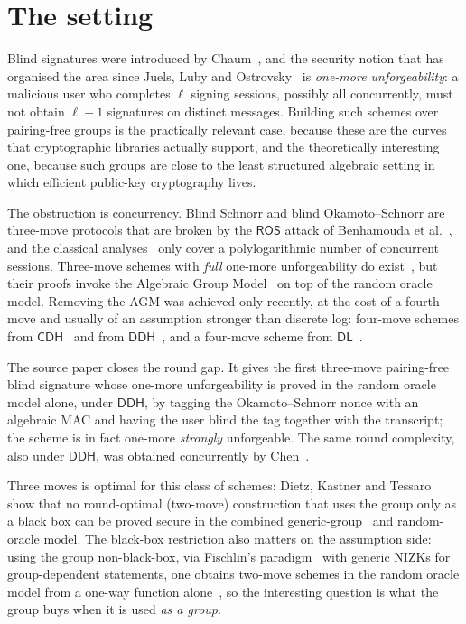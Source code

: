 \documentclass{conjura-conjecture}
\newcommand{\DL}{\mathsf{DL}}
\newcommand{\DDH}{\mathsf{DDH}}
\newcommand{\CDH}{\mathsf{CDH}}
\newcommand{\ROSassm}{\mathsf{ROS}}
\begin{document}
\section{The setting}\label{sec:setting}

Blind signatures were introduced by Chaum~\cite{Cha82}, and the security
notion that has organised the area since Juels, Luby and
Ostrovsky~\cite{JLO97} is \emph{one-more unforgeability}: a malicious user
who completes $\ell$ signing sessions, possibly all concurrently, must not
obtain $\ell + 1$ signatures on distinct messages. Building such schemes
over pairing-free groups is the practically relevant case, because these
are the curves that cryptographic libraries actually support, and the
theoretically interesting one, because such groups are close to the least
structured algebraic setting in which efficient public-key cryptography
lives.

The obstruction is concurrency. Blind Schnorr and blind Okamoto--Schnorr
are three-move protocols that are broken by the $\ROSassm$ attack of
Benhamouda et al.~\cite{BLL21}, and the classical analyses~\cite{PS00}
only cover a polylogarithmic number of concurrent sessions. Three-move
schemes with \emph{full} one-more unforgeability do exist~\cite{Abe01,TZ22},
but their proofs invoke the Algebraic Group Model~\cite{FKL18} on top of
the random oracle model. Removing the AGM was achieved only recently, at
the cost of a fourth move and usually of an assumption stronger than
discrete log: four-move schemes from $\CDH$~\cite{CATZ24} and from
$\DDH$~\cite{KR25}, and a four-move scheme from $\DL$~\cite{KLR25}.

The source paper closes the round gap. It gives the first three-move
pairing-free blind signature whose one-more unforgeability is proved in
the random oracle model alone, under $\DDH$, by tagging the
Okamoto--Schnorr nonce with an algebraic MAC and having the user blind the
tag together with the transcript; the scheme is in fact one-more
\emph{strongly} unforgeable. The same round complexity, also under $\DDH$,
was obtained concurrently by Chen~\cite{Che26}.

Three moves is optimal for this class of schemes: Dietz, Kastner and
Tessaro~\cite{DKT26} show that no round-optimal (two-move) construction
that uses the group only as a black box can be proved secure in the
combined generic-group~\cite{Sho97,Mau05} and random-oracle model. The
black-box restriction also matters on the assumption side: using the group
non-black-box, via Fischlin's paradigm~\cite{Fis06} with generic NIZKs for
group-dependent statements, one obtains two-move schemes in the random
oracle model from a one-way function alone~\cite{CMV26}, so the
interesting question is what the group buys when it is used \emph{as a
group}.
\end{document}
